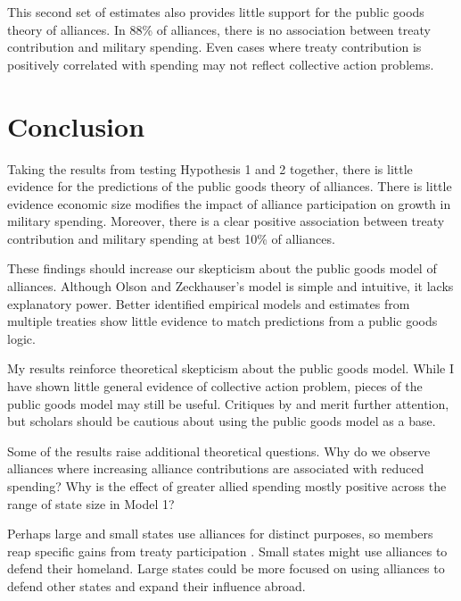 \documentclass[12pt]{article}
\begin{document}
This second set of estimates also provides little support for the public goods theory of alliances. 
In 88\% of alliances, there is no association between treaty contribution and military spending. 
Even cases where treaty contribution is positively correlated with spending may not reflect collective action problems. 



\section{Conclusion}

Taking the results from testing Hypothesis 1 and 2 together, there is little evidence for the predictions of the public goods theory of alliances. 
There is little evidence economic size modifies the impact of alliance participation on growth in military spending.
Moreover, there is a clear positive association between treaty contribution and military spending at best 10\% of alliances. 


These findings should increase our skepticism about the public goods model of alliances. 
Although Olson and Zeckhauser's model is simple and intuitive, it lacks explanatory power. 
Better identified empirical models and estimates from multiple treaties show little evidence to match predictions from a public goods logic. 


My results reinforce theoretical skepticism about the public goods model. 
While I have shown little general evidence of collective action problem, pieces of the public goods model may still be useful. 
Critiques by \citet{Palmer1990} and \citet{SandlerHartley2001} merit further attention, but scholars should be cautious about using the public goods model as a base. 


Some of the results raise additional theoretical questions. 
Why do we observe alliances where increasing alliance contributions are associated with reduced spending?
Why is the effect of greater allied spending mostly positive across the range of state size in Model 1? 


Perhaps large and small states use alliances for distinct purposes, so members reap specific gains from treaty participation \citep{Morrow1991, Johnson2015}. 
Small states might use alliances to defend their homeland. 
Large states could be more focused on using alliances to defend other states and expand their influence abroad. 
\end{document}
